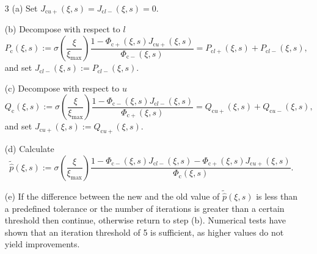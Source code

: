 \documentclass[11pt,a4paper]{article}
\begin{document}
\begin{enumerate}
\item[3 (a)] Set $J_{\mathrm{c}u+}(\xi,s)=J_{\mathrm{c}l-}(\xi,s)=0$.
\item[\phantom{3. }(b)] Decompose with respect to $l$
\begin{equation}
\label{eq:Pcdecomp}
P_{\mathrm{c}}(\xi,s):=\sigma\left(\frac{\xi}{\xi_{\max}}\right)\frac{1-\Phi_{\mathrm{c}+}(\xi,s)J_{\mathrm{c}u+}(\xi,s)}{\Phi_{\mathrm{c}-}(\xi,s)} = P_{\mathrm{c}l+}(\xi,s)+P_{\mathrm{c}l-}(\xi,s),
\end{equation}
and set $J_{\mathrm{c}l-}(\xi,s):=P_{\mathrm{c}l-}(\xi,s)$.
\item[\phantom{3. }(c)] Decompose with respect to $u$
\begin{equation}
\label{eq:Qdecomp}
Q_{\mathrm{c}}(\xi,s):=\sigma\left(\frac{\xi}{\xi_{\max}}\right)\frac{1-\Phi_{\mathrm{c}-}(\xi,s)J_{\mathrm{c}l-}(\xi,s)}{\Phi_{\mathrm{c}+}(\xi,s)} = Q_{\mathrm{c}u+}(\xi,s)+Q_{\mathrm{c}u-}(\xi,s),
\end{equation}
and set $J_{\mathrm{c}u+}(\xi,s):=Q_{\mathrm{c}u+}(\xi,s)$.
\item[\phantom{3. }(d)] Calculate
\begin{equation}
\label{eq:FinalfpCalc}
\widetilde{\widehat{p}}(\xi,s):=\sigma\left(\frac{\xi}{\xi_{\max}}\right)\frac{1-\Phi_{\mathrm{c}-}(\xi,s)J_{\mathrm{c}l-}(\xi,s)-\Phi_{\mathrm{c}+}(\xi,s)J_{\mathrm{c}u+}(\xi,s)}{\Phi_\mathrm{c}(\xi,s)}.
\end{equation}
\item[\phantom{3. }(e)] If the difference between the new and the old value of $\widetilde{\widehat{p}}(\xi,s)$ is less than a predefined tolerance or the number of iterations is greater than a certain threshold then continue, otherwise return to step (b). Numerical tests have shown that an iteration threshold of 5 is sufficient, as higher values do not yield improvements.
\end{enumerate}
\end{document}
